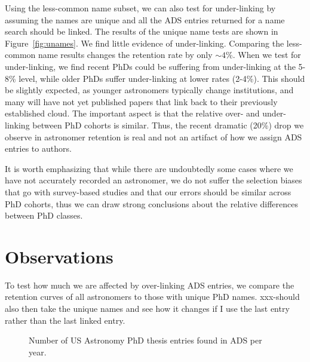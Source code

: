 \documentclass{emulateapj}
\begin{document}
Using the less-common name subset, we can also test for under-linking by assuming the names are unique and all the ADS entries returned for a name search should be linked.  The results of the unique name tests are shown in Figure~\ref{fig:unames}. We find little evidence of under-linking. Comparing the less-common name results changes the retention rate by only $\sim4$\%. When we test for under-linking, we find recent PhDs could be suffering from under-linking at the 5-8\% level, while older PhDs suffer under-linking at lower rates (2-4\%).  This should be slightly expected, as younger astronomers typically change institutions, and many will have not yet published papers that link back to their previously established cloud.  The important aspect is that the relative over- and under-linking between PhD cohorts is similar.  Thus, the recent dramatic (20\%) drop we observe in astronomer retention is real and not an artifact of how we assign ADS entries to authors.

\begin{figure*}
  \caption{Solid lines show the residuals when comparing to retention curves constructed with unique names (e.g., a sub-sample that should suffer from little to no over-linking).  The dashed lines shows the comparision to unique names when the unique name group is assumed to have a completely linked network (e.g., a subsample that suffers from little to no under-linking).  \label{fig:unames}}
  \end{figure*}


It is worth emphasizing that while there are undoubtedly some cases where we have not accurately recorded an astronomer, we do not suffer the selection biases that go with survey-based studies and that our errors should be similar across PhD cohorts, thus we can draw strong conclusions about the relative differences between PhD classes.

\section{Observations}

To test how much we are affected by over-linking ADS entries, we compare the retention curves of all astronomers to those with unique PhD names.  xxx-should also then take the unique names and see how it changes if I use the last entry rather than the last linked entry.


\begin{figure}
  \caption{Number of US Astronomy PhD thesis entries found in ADS per year. \label{fig:phdperyear}}
\end{figure}
\end{document}

